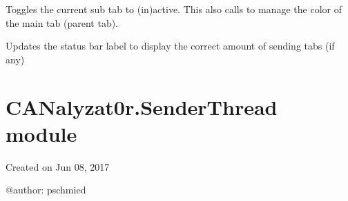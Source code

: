 \documentclass[letterpaper,10pt,english]{sphinxmanual}
\begin{document}
\begin{fulllineitems}
\begin{fulllineitems}
\begin{quote}
\begin{description}
\end{description}\end{quote}

\end{fulllineitems}


\begin{fulllineitems}
\label{\detokenize{src:src.SenderTabElement.SenderTabElement.toggleLoopActive}}
Toggles the current sub tab to (in)active. This also calls {\hyperref[\detokenize{src:src.SenderTab.SenderTab.toggleActive}]{}} to manage
the color of the main tab (parent tab).

\end{fulllineitems}


\begin{fulllineitems}
\label{\detokenize{src:src.SenderTabElement.SenderTabElement.updateStatusBar}}
Updates the status bar label to display the correct amount of sending tabs (if any)

\end{fulllineitems}


\end{fulllineitems}



\section{CANalyzat0r.SenderThread module}
\label{\detokenize{src:module-src.SenderThread}}\label{\detokenize{src:canalyzat0r-senderthread-module}}
Created on Jun 08, 2017

@author: pschmied
\end{document}
